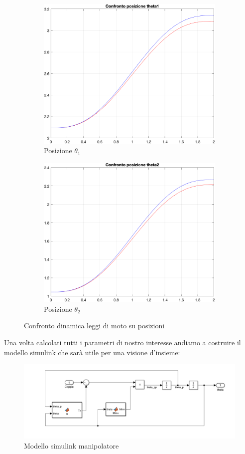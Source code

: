 \begin{figure}[!ht]
\begin{subfigure}{.45\textwidth}
  \centering
  \includegraphics[width=.78\linewidth]{Immagini/Dinamica/confrpost1.png}  
  \caption{Posizione $\theta_1$}
  \label{fig:sub-firsta}
\end{subfigure}
\begin{subfigure}{.45\textwidth}
  \centering
  \includegraphics[width=.78\linewidth]{Immagini/Dinamica/confrpost2.png}  
  \caption{Posizione $\theta_2$}
  \label{fig:sub-seconda}
\end{subfigure}
\caption{Confronto dinamica leggi di moto su posizioni}
\end{figure}
Una volta calcolati tutti i parametri di nostro interesse andiamo a costruire il modello simulink che sarà utile per una visione d'insieme:
\begin{figure}[ht]
	\begin{center}
		\includegraphics[scale=0.55]{Immagini/Dinamica/ModSimulink}
		\caption{Modello simulink manipolatore}
	\end{center}
\end{figure}
